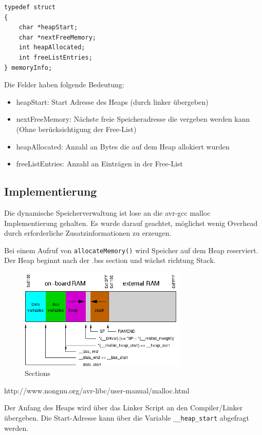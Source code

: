 \documentclass[fontsize=12pt, toc=bibliography, notitlepage]{scrreprt}
\begin{document}
\begin{lstlisting}[title=memory.h]
typedef struct
{
	char *heapStart;
	char *nextFreeMemory;
	int heapAllocated;
	int freeListEntries;
} memoryInfo;
\end{lstlisting}

Die Felder haben folgende Bedeutung:

\begin{itemize}
	\item heapStart: Start Adresse des Heaps (durch linker übergeben)
	\item nextFreeMemory: Nächste freie Speicheradresse die vergeben werden kann (Ohne berücksichtigung der Free-List)
	\item heapAllocated: Anzahl an Bytes die auf dem Heap allokiert wurden
	\item freeListEntries: Anzahl an Einträgen in der Free-List
\end{itemize}

\subsection{Implementierung}
\label{subsec:mem-impl}
Die dynamische Speicherverwaltung ist lose an die avr-gcc malloc Implementierung gehalten. Es wurde darauf geachtet, möglichst wenig Overhead durch erforderliche Zusatzinformationen zu erzeugen.

Bei einem Aufruf von \lstinline$allocateMemory()$ wird Speicher auf dem Heap reserviert. Der Heap beginnt nach der .bss section und wächst richtung Stack.

\begin{figure}[H]
	\centering
	\includegraphics[width=300px]{images/malloc-std.png}
	\caption{Sections}
	\label{fig:sections}
\end{figure}

http://www.nongnu.org/avr-libc/user-manual/malloc.html


Der Anfang des Heaps wird über das Linker Script an den Compiler/Linker übergeben. Die Start-Adresse kann über die Variable \lstinline$__heap_start$ abgefragt werden.
\end{document}

